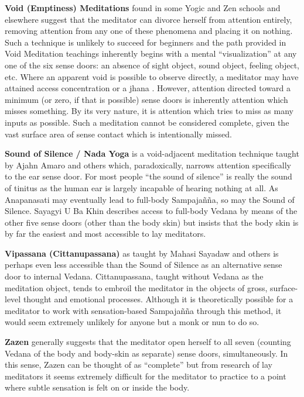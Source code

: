 \documentclass[a4paper, amsfonts, amssymb, amsmath, reprint, showkeys, nofootinbib, twoside]{revtex4-1}
\begin{document}
\textbf{Void (Emptiness) Meditations} found in some Yogic and Zen schools and
elsewhere suggest that the meditator can
divorce herself from attention entirely, removing attention from any one of these
phenomena and placing it on nothing. Such a technique is unlikely to succeed for
beginners and the path provided in Void Meditation teachings inherently begins with a
mental ``visualization'' at any one of the six sense doors: an absence of sight
object, sound object, feeling object, etc. Where an apparent void is possible to
observe directly, a meditator may have attained access concentration  or a jhana . However, attention
directed toward a minimum (or zero, if that is possible) sense doors is inherently
attention which misses something. By its very nature, it is attention which tries to
miss as many inputs as possible. Such a meditation cannot be considered complete,
given the vast surface area of sense contact which is intentionally missed.

\textbf{Sound of Silence / Nada Yoga} is a void-adjacent meditation technique taught
by Ajahn Amaro and others which, paradoxically, narrows attention specifically to the
ear sense door. For most people ``the sound of silence'' is really the sound of
tinitus  as the human ear is largely incapable of
hearing nothing at all. As Anapanasati may eventually lead to full-body Sampajañña,
so may the Sound of Silence. Sayagyi U Ba Khin describes access to full-body Vedana
by means of the other five sense doors (other than the body skin) but insists that
the body skin is by far the easiest and most accessible to lay meditators. 

\textbf{Vipassana (Cittanupassana)}  as taught by
Mahasi Sayadaw and others is perhaps
even less accessible than the Sound of Silence as an alternative sense door to
internal Vedana. Cittanupassana, taught without Vedana as the meditation object,
tends to embroil the meditator in the objects of gross, surface-level thought and
emotional processes. Although it is theoretically possible for a meditator to work
with sensation-based Sampajañña through this method, it would seem extremely unlikely
for anyone but a monk or nun to do so.

\textbf{Zazen} generally suggests that the meditator open herself to all seven
(counting Vedana of the body and body-skin as separate) sense doors,
simultaneously. In this sense, Zazen can be thought of as ``complete'' but from
research of lay meditators it seems extremely difficult for the meditator to practice
to a point where subtle sensation is felt on or inside the body.
\end{document}
